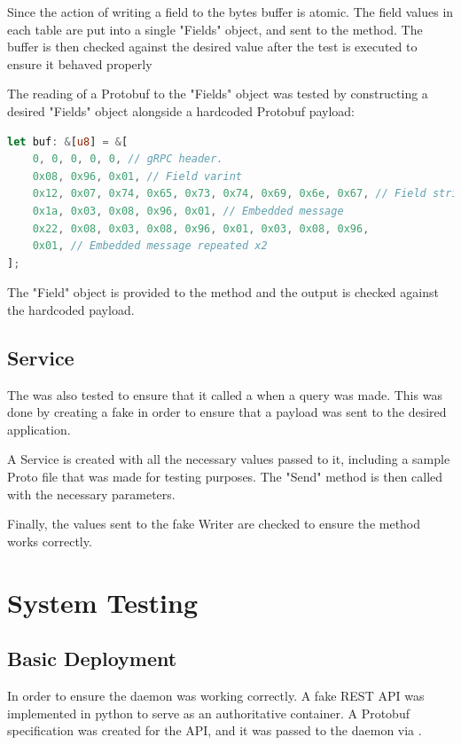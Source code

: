 \documentclass[a4paper,12pt]{report}
\begin{document}
Since the action of writing a field to the bytes buffer is atomic. The field values in each table are put into a single "Fields" object, and sent to the method.
The buffer is then checked against the desired value after the test is executed to ensure it behaved properly

The reading of a Protobuf to the "Fields" object was tested by constructing a desired "Fields" object alongside a hardcoded Protobuf payload:
\begin{lstlisting}[language=Rust]
let buf: &[u8] = &[
    0, 0, 0, 0, 0, // gRPC header.
    0x08, 0x96, 0x01, // Field varint
    0x12, 0x07, 0x74, 0x65, 0x73, 0x74, 0x69, 0x6e, 0x67, // Field string
    0x1a, 0x03, 0x08, 0x96, 0x01, // Embedded message
    0x22, 0x08, 0x03, 0x08, 0x96, 0x01, 0x03, 0x08, 0x96,
    0x01, // Embedded message repeated x2
];
\end{lstlisting}

The "Field" object is provided to the method and the output is checked against the hardcoded payload.

\subsection{Service}
The \textit{} was also tested to ensure that it called a \textit{} when a query was made.
This was done by creating a fake  in order to ensure that a payload was sent to the desired application. 

A Service is created with all the necessary values passed to it, including a sample Proto file that was made for testing purposes.
The "Send" method is then called with the necessary parameters. 

Finally, the values sent to the fake Writer are checked to ensure the method works correctly.

\section{System Testing}
\label{sec:test}
\subsection{Basic Deployment}
In order to ensure the daemon was working correctly. A fake REST API was implemented in python to serve as an authoritative container.
A Protobuf specification was created for the API, and it was passed to the daemon via \textit{}.
\end{document}
